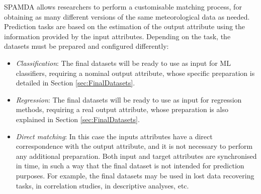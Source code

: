 \documentclass[energies,article,submit,moreauthors,pdftex]{Definitions/mdpi}
\begin{document}
				SPAMDA allows researchers to perform a customisable matching process, for obtaining as many different versions of the same meteorological data as needed.
				Prediction tasks are based on the estimation of the output attribute using the information provided by the input attributes. Depending on the task, the datasets must be prepared and configured differently:
				\begin{itemize}
					\item \textit{Classification}: The final datasets will be ready to use as input for ML classifiers, requiring a nominal output attribute, whose specific preparation is detailed in Section \ref{sec:FinalDatasets}.
					\item \textit{Regression}: The final datasets will be ready to use as input for regression methods, requiring a real output attribute, whose preparation is also explained in Section \ref{sec:FinalDatasets}.
					\item \textit{Direct matching}: In this case the inputs attributes have a direct correspondence with the output attribute, and it is not necessary to perform any additional preparation. Both input and target attributes are synchronised in time, in such a way that the final dataset is not intended for prediction purposes. For example, the final datasets may be used in lost data recovering tasks, in correlation studies, in descriptive analyses, etc.
				\end{itemize}
				
\end{document}
